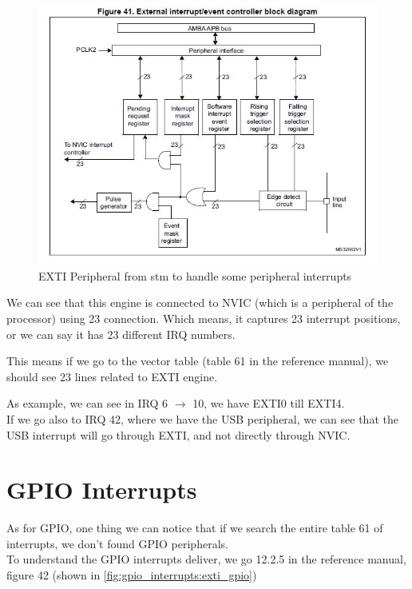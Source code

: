 \begin{figure}[h]
\centering
\includegraphics[scale=0.9,frame]{Figures/gpio_interrupts/exti_engine}
\caption{EXTI Peripheral from stm to handle some peripheral interrupts}
\label{fig:gpio_interrupts:exti_engine}
\end{figure}

We can see that this engine is connected to NVIC (which is a peripheral of the processor) using 23 connection. Which means, it captures 23 interrupt positions, or we can say it has 23 different IRQ numbers.

This means if we go to the vector table (table 61 in the reference manual), we should see 23 lines related to EXTI engine.

As example, we can see in IRQ 6 $\rightarrow$ 10, we have EXTI0 till EXTI4.\\

If we go also to IRQ 42, where we have the USB peripheral, we can see that the USB interrupt will go through EXTI, and not directly through NVIC.\\

\newpage
\section{GPIO Interrupts}

As for GPIO, one thing we can notice that if we search the entire table 61 of interrupts, we don't found GPIO peripherals.\\

To understand the GPIO interrupts deliver, we go 12.2.5 in the reference manual, figure 42 (shown in \autoref{fig:gpio_interrupts:exti_gpio})

